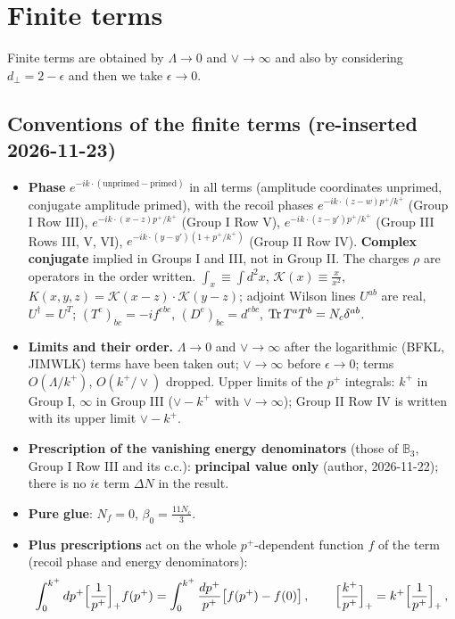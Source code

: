 \documentclass[9pt]{article}
\numberwithin{equation}{section}
\begin{document}
\section{Finite terms}
Finite terms are obtained by $\Lambda \to 0$ and $\vee\to \infty $ and also by considering $d_{\perp} = 2-\epsilon$ and then we take $\epsilon \to 0$. 
{\color{red}
\subsection*{Conventions of the finite terms (re-inserted 2026-11-23)}\label{sec:conv2}
\begin{itemize}
\item \textbf{Phase} $e^{-ik\cdot(\text{unprimed}-\text{primed})}$ in all terms (amplitude coordinates unprimed, conjugate amplitude primed), with the recoil phases $e^{-ik\cdot(z-w)p^{+}/k^{+}}$ (Group I Row III), $e^{-ik\cdot(x-z)p^{+}/k^{+}}$ (Group I Row V), $e^{-ik\cdot(z-y')p^{+}/k^{+}}$ (Group III Rows III, V, VI), $e^{-ik\cdot(y-y')(1+p^{+}/k^{+})}$ (Group II Row IV). \textbf{Complex conjugate} implied in Groups I and III, not in Group II. The charges $\rho$ are operators in the order written. $\int_{x}\equiv\int d^{2}x$, $\mathcal{K}(x)\equiv\frac{x}{x^{2}}$, $K(x,y,z)=\mathcal{K}(x-z)\cdot\mathcal{K}(y-z)$; adjoint Wilson lines $U^{ab}$ are real, $U^{\dagger}=U^{T}$; $(T^{e})_{bc}=-if^{ebc}$, $(D^{e})_{bc}=d^{ebc}$, ${\rm Tr}\,T^{a}T^{b}=N_{c}\delta^{ab}$.
\item \textbf{Limits and their order.} $\Lambda\to0$ and $\vee\to\infty$ after the logarithmic (BFKL, JIMWLK) terms have been taken out; $\vee\to\infty$ before $\epsilon\to0$; terms $O(\Lambda/k^{+})$, $O(k^{+}/\vee)$ dropped. Upper limits of the $p^{+}$ integrals: $k^{+}$ in Group I, $\infty$ in Group III ($\vee-k^{+}$ with $\vee\to\infty$); Group II Row IV is written with its upper limit $\vee-k^{+}$.
\item \textbf{Prescription of the vanishing energy denominators} (those of $\mathbb{B}_{3}$, Group I Row III and its c.c.): \textbf{principal value only} (author, 2026-11-22); there is no $i\epsilon$ term $\Delta N$ in the result.
\item \textbf{Pure glue}: $N_{f}=0$, $\beta_{0}=\frac{11N_{c}}{3}$.
\item \textbf{Plus prescriptions} act on the whole $p^{+}$-dependent function $f$ of the term (recoil phase and energy denominators):
\begin{align}\label{eq:plus2}
\int_{0}^{k^{+}}dp^{+}\Big[\frac{1}{p^{+}}\Big]_{+}f(p^{+})&=\int_{0}^{k^{+}}\frac{dp^{+}}{p^{+}}\big[f(p^{+})-f(0)\big]\,,\qquad\Big[\frac{k^{+}}{p^{+}}\Big]_{+}=k^{+}\Big[\frac{1}{p^{+}}\Big]_{+}\,,\notag\\

\end{align}
\end{itemize}}
\end{document}
